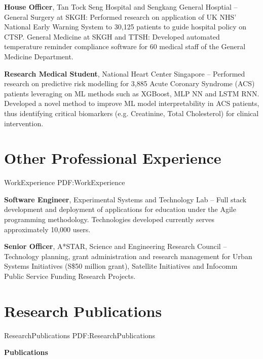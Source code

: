\documentclass[letterpaper,10pt,oneside]{article}
\begin{document}
\begin{body}
\BigGap
{\textbf{House Officer}, Tan Tock Seng Hospital and Sengkang General Hosptial}
\hfill
{} --
\BulletItem
General Surgery at SKGH: Performed research on application of UK NHS' National Early Warning System to 30,125 patients to guide hospital policy on CTSP.
\BulletItem
General Medicine at SKGH and TTSH: Developed automated temperature reminder compliance software for 60 medical staff of the General Medicine Department.

\BigGap
{\textbf{Research Medical Student}, National Heart Center Singapore}
\hfill
{} --  
\BulletItem 
Performed research on predictive risk modelling for 3,885 Acute Coronary Syndrome (ACS) patients leveraging on ML methods such as XGBoost, MLP NN and LSTM RNN.
\BulletItem
Developed a novel method to improve ML model interpretability in ACS patients, thus identifying critical biomarkers (e.g. Creatinine, Total Cholesterol) for clinical intervention.

\section
{Other Professional Experience}
{WorkExperience}
{PDF:WorkExperience}

{\textbf{Software Engineer}, Experimental Systems and Technology Lab}
\hfill
{} --
\BulletItem
Full stack development and deployment of applications for education under the Agile programming methodology. Technologies developed currently serves approximately 10,000 users.

\BigGap
{\textbf{Senior Officer}, A*STAR, Science and Engineering Research Council}
\hfill
{} --
\BulletItem
Technology planning, grant administration and research management for Urban Systems Initiatives (S\$50 million grant), Satellite Initiatives and Infocomm Public Service Funding Research Projects.



\section
{Research Publications}
{ResearchPublications}
{PDF:ResearchPublications}

\textbf{Publications}
\GapNoBreak
{}


\end{body}
\end{document}
